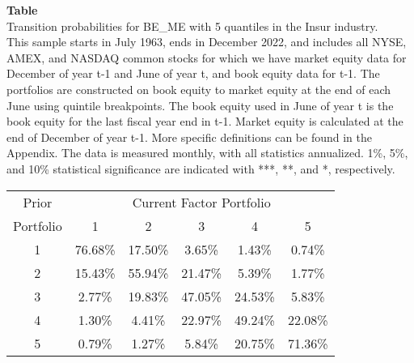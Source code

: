 \begin{table*}[ht!]
\raggedright
{}
\label{tab: transition_probs_BE_ME_Insur_with_5_quantiles}
\textbf{Table \thetable} \\
Transition probabilities for BE_ME with 5 quantiles in the Insur industry. \\
\hspace*{1em}This sample starts in July 1963, ends in December 2022, and includes all NYSE, AMEX, and NASDAQ common stocks for which we have market equity data for December of year t-1 and June of year t, and book equity data for t-1. The portfolios are constructed on book equity to market equity at the end of each June using quintile breakpoints.  The book equity used in June of year t is the book equity for the last fiscal year end in t-1.  Market equity is calculated at the end of December of year t-1.  More specific definitions can be found in the Appendix.  The data is measured monthly, with all statistics annualized.  1\%, 5\%, and 10\% statistical significance are indicated with ***, **, and *, respectively. \\
\vspace{0.5em}
\centering
\begin{adjustbox}{max width=\textwidth}
\begin{tabular}{@{}cccccc@{}}
\toprule
Prior & \multicolumn{5}{c}{Current Factor Portfolio} \\
Portfolio & 1 & 2 & 3 & 4 & 5 \\
\midrule
1 & 76.68\% & 17.50\% & 3.65\% & 1.43\% & 0.74\% \\
2 & 15.43\% & 55.94\% & 21.47\% & 5.39\% & 1.77\% \\
3 & 2.77\% & 19.83\% & 47.05\% & 24.53\% & 5.83\% \\
4 & 1.30\% & 4.41\% & 22.97\% & 49.24\% & 22.08\% \\
5 & 0.79\% & 1.27\% & 5.84\% & 20.75\% & 71.36\% \\
\bottomrule
\end{tabular}
\end{adjustbox}
\end{table*}